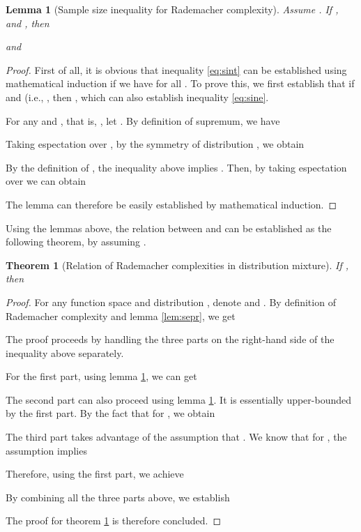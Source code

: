 \documentclass[letterpaper]{article}
\newtheorem{theorem}{Theorem}
\newtheorem{lemma}{Lemma}
\begin{document}
\begin{lemma}[Sample size inequality for Rademacher complexity]
  \label{lem:sinr}
  Assume . If ,  and , then
  
  and
  
\end{lemma}
\begin{proof}
  First of all, it is obvious that inequality \ref{eq:sint} can be established using mathematical induction if we have  for all . To prove this, we first establish that if  and  (i.e., , then , which can also establish inequality \ref{eq:sine}.

  For any  and , that is, , let . By definition of supremum, we have
  
  Taking espectation over , by the symmetry of distribution , we obtain
  
  By the definition of , the inequality above implies . Then, by taking espectation over  we can obtain
  
  The lemma can therefore be easily established by mathematical induction.
\end{proof}

Using the lemmas above, the relation between  and  can be established as the following theorem, by assuming .

\begin{theorem}[Relation of Rademacher complexities in distribution mixture]
  \label{thm:rerm}
  If , then
  
\end{theorem}

\begin{proof}
  For any function space  and distribution , denote  and . By definition of Rademacher complexity and lemma \ref{lem:sepr}, we get
  
  The proof proceeds by handling the three parts on the right-hand side of the inequality above separately.

  For the first part, using lemma \ref{lem:sinr}, we can get
  

  The second part can also proceed using lemma \ref{lem:sinr}. It is essentially upper-bounded by the first part. By the fact that  for , we obtain
  

  The third part takes advantage of the assumption that . We know that for , the assumption  implies
  
  Therefore, using the first part, we achieve
  

  By combining all the three parts above, we establish
  
  The proof for theorem \ref{thm:rerm} is therefore concluded.
\end{proof}
\end{document}
